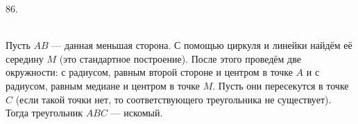 86. \begin{figure}[ht!]
\end{figure}\\
Пусть $AB$ --- данная меньшая сторона. С помощью циркуля и линейки найдём её середину $M$ (это стандартное построение). После этого проведём две окружности: с радиусом, равным второй стороне и центром в точке $A$ и с радиусом, равным медиане и центром в точке $M.$ Пусть они пересекутся в точке $C$ (если такой точки нет, то соответствующего треугольника не существует). Тогда треугольник $ABC$ --- искомый.\\
